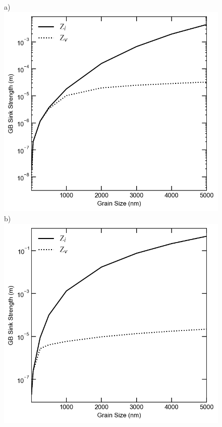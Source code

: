 \documentclass[utf8]{frontiersSCNS} %
\begin{document}
    \begin{figure}[h!]  %
        \centering
        a)\includegraphics[scale=0.55]{Fig9_a}
        b)\includegraphics[scale=0.55]{Fig9_b}
        \qquad

\end{figure}
\end{document}
